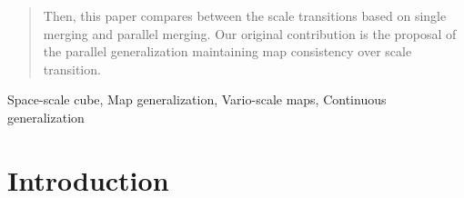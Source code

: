 \documentclass[]{interact}
\begin{document}
\begin{abstract}
Then, this paper compares between the scale transitions 
based on single merging and parallel merging.
Our original contribution is the proposal of the parallel generalization
maintaining map consistency over scale transition. 
\end{abstract}

\begin{keywords}
Space-scale cube, Map generalization, Vario-scale maps, Continuous generalization
\end{keywords}


\section{Introduction}
\end{document}
